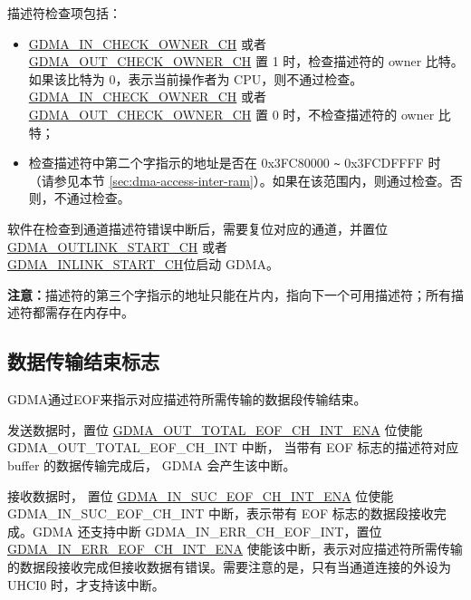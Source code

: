 \documentclass[main\_\_CN.tex]{subfiles}
\begin{document}
描述符检查项包括：
\begin{itemize}
    \item \hyperref[fielddesc:GDMAINCHECKOWNERCHN]{GDMA\_IN\_CHECK\_OWNER\_CH} 或者 \hyperref[fielddesc:GDMAOUTCHECKOWNERCHN]{GDMA\_OUT\_CHECK\_OWNER\_CH} 置 1 时，检查描述符的 owner 比特。如果该比特为 0，表示当前操作者为 CPU，则不通过检查。\hyperref[fielddesc:GDMAINCHECKOWNERCHN]{GDMA\_IN\_CHECK\_OWNER\_CH} 或者 \hyperref[fielddesc:GDMAOUTCHECKOWNERCHN]{GDMA\_OUT\_CHECK\_OWNER\_CH} 置 0 时，不检查描述符的 owner 比特；\\

    \item 检查描述符中第二个字指示的地址是否在 0x3FC80000 \verb+~+ 0x3FCDFFFF 时（请参见本节 \ref{sec:dma-access-inter-ram}）。如果在该范围内，则通过检查。否则，不通过检查。\\
\end{itemize}

软件在检查到通道描述符错误中断后，需要复位对应的通道，并置位 \hyperref[fielddesc:GDMAOUTLINKSTARTCHN]{GDMA\_OUTLINK\_START\_CH} 或者 \\ \hyperref[fielddesc:GDMAINLINKSTARTCHN]{GDMA\_INLINK\_START\_CH}位启动 GDMA。

{\bfseries 注意：}描述符的第三个字指示的地址只能在片内，指向下一个可用描述符；所有描述符都需存在内存中。


\subsection{数据传输结束标志}

GDMA通过EOF来指示对应描述符所需传输的数据段传输结束。

发送数据时，置位 \hyperref[fielddesc:GDMAOUTTOTALEOFCHNINTENA]{GDMA\_OUT\_TOTAL\_EOF\_CH\_INT\_ENA} 位使能 GDMA\_OUT\_TOTAL\_EOF\_CH\_INT 中断， 当带有 EOF 标志的描述符对应 buffer 的数据传输完成后， GDMA 会产生该中断。 

接收数据时， 置位 \hyperref[fielddesc:GDMAINSUCEOFCHNINTENA]{GDMA\_IN\_SUC\_EOF\_CH\_INT\_ENA} 位使能 GDMA\_IN\_SUC\_EOF\_CH\_INT 中断，表示带有 EOF 标志的数据段接收完成。GDMA 还支持中断 GDMA\_IN\_ERR\_CH\_EOF\_INT，置位 \\\hyperref[fielddesc:GDMAINERREOFCHNINTENA]{GDMA\_IN\_ERR\_EOF\_CH\_INT\_ENA} 使能该中断，表示对应描述符所需传输的数据段接收完成但接收数据有错误。需要注意的是，只有当通道连接的外设为 UHCI0 时，才支持该中断。
\end{document}
